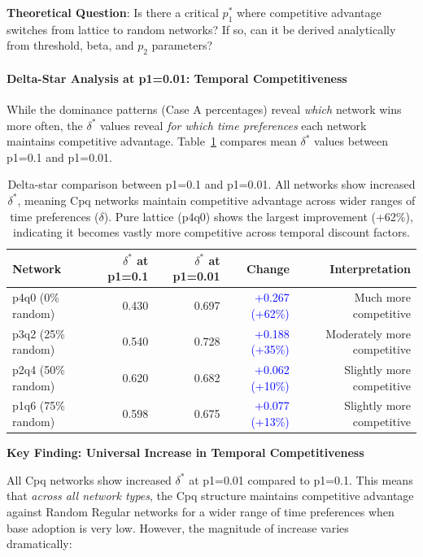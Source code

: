 \documentclass[12pt,a4paper]{article}
\begin{document}
\textbf{Theoretical Question}: Is there a critical $p_1^*$ where competitive advantage switches from lattice to random networks? If so, can it be derived analytically from threshold, beta, and $p_2$ parameters?

\paragraph{Delta-Star Analysis at p1=0.01: Temporal Competitiveness}

While the dominance patterns (Case A percentages) reveal \textit{which} network wins more often, the $\delta^*$ values reveal \textit{for which time preferences} each network maintains competitive advantage. Table~\ref{tab:deltastar_p1_comparison} compares mean $\delta^*$ values between p1=0.1 and p1=0.01.

\begin{table}[H]
\centering
\begin{tabular}{@{}lrrrr@{}}
\toprule
\textbf{Network} & \textbf{$\delta^*$ at p1=0.1} & \textbf{$\delta^*$ at p1=0.01} & \textbf{Change} & \textbf{Interpretation} \\
\midrule
p4q0 (0\% random)  & 0.430 & 0.697 & \textcolor{blue}{+0.267 (+62\%)} & Much more competitive \\
p3q2 (25\% random) & 0.540 & 0.728 & \textcolor{blue}{+0.188 (+35\%)} & Moderately more competitive \\
p2q4 (50\% random) & 0.620 & 0.682 & \textcolor{blue}{+0.062 (+10\%)} & Slightly more competitive \\
p1q6 (75\% random) & 0.598 & 0.675 & \textcolor{blue}{+0.077 (+13\%)} & Slightly more competitive \\
\bottomrule
\end{tabular}
\caption{Delta-star comparison between p1=0.1 and p1=0.01. All networks show increased $\delta^*$, meaning Cpq networks maintain competitive advantage across wider ranges of time preferences ($\delta$). Pure lattice (p4q0) shows the largest improvement (+62\%), indicating it becomes vastly more competitive across temporal discount factors.}
\label{tab:deltastar_p1_comparison}
\end{table}

\textbf{Key Finding: Universal Increase in Temporal Competitiveness}

All Cpq networks show increased $\delta^*$ at p1=0.01 compared to p1=0.1. This means that \textit{across all network types}, the Cpq structure maintains competitive advantage against Random Regular networks for a wider range of time preferences when base adoption is very low. However, the magnitude of increase varies dramatically:
\end{document}
